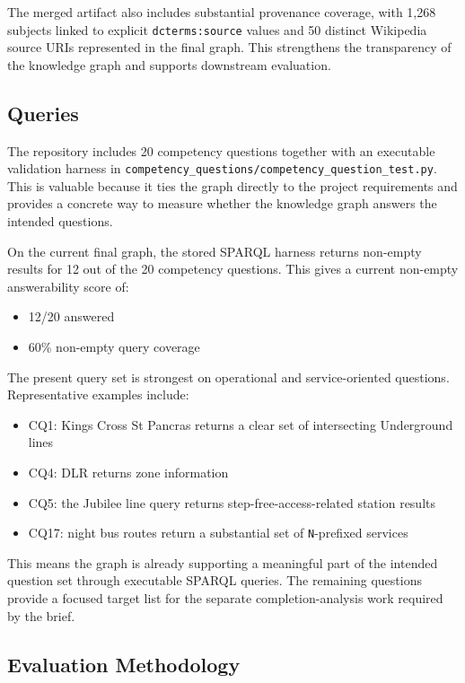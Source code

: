 \documentclass[
  11pt,
  a4paper,
]{article}
\providecommand{\tightlist}{%
  \setlength{\itemsep}{0pt}\setlength{\parskip}{0pt}}
\begin{document}
The merged artifact also includes substantial provenance coverage, with
1,268 subjects linked to explicit \texttt{dcterms:source} values and 50
distinct Wikipedia source URIs represented in the final graph. This
strengthens the transparency of the knowledge graph and supports
downstream evaluation.

\subsection{Queries}\label{queries}

The repository includes 20 competency questions together with an
executable validation harness in
\texttt{competency\_questions/competency\_question\_test.py}. This is
valuable because it ties the graph directly to the project requirements
and provides a concrete way to measure whether the knowledge graph
answers the intended questions.

On the current final graph, the stored SPARQL harness returns non-empty
results for 12 out of the 20 competency questions. This gives a current
non-empty answerability score of:

\begin{itemize}
\tightlist
\item
  12/20 answered
\item
  60\% non-empty query coverage
\end{itemize}

The present query set is strongest on operational and service-oriented
questions. Representative examples include:

\begin{itemize}
\tightlist
\item
  CQ1: King\textquotesingle s Cross St Pancras returns a clear set of
  intersecting Underground lines
\item
  CQ4: DLR returns zone information
\item
  CQ5: the Jubilee line query returns step-free-access-related station
  results
\item
  CQ17: night bus routes return a substantial set of \texttt{N}-prefixed
  services
\end{itemize}

This means the graph is already supporting a meaningful part of the
intended question set through executable SPARQL queries. The remaining
questions provide a focused target list for the separate
completion-analysis work required by the brief.

\subsection{Evaluation Methodology}\label{evaluation-methodology}
\end{document}
